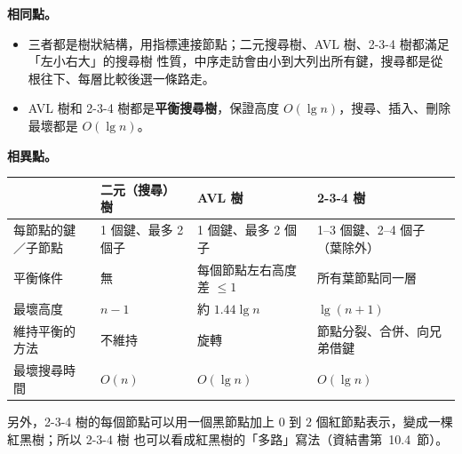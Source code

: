 \begin{pastsoln}
\textbf{相同點。}
\begin{itemize}[nosep]
\item 三者都是樹狀結構，用指標連接節點；二元搜尋樹、AVL 樹、2-3-4 樹都滿足「左小右大」的搜尋樹
性質，中序走訪會由小到大列出所有鍵，搜尋都是從根往下、每層比較後選一條路走。
\item AVL 樹和 2-3-4 樹都是\textbf{平衡搜尋樹}，保證高度 $O(\lg n)$，搜尋、插入、刪除最壞都是
$O(\lg n)$。
\end{itemize}

\textbf{相異點。}
\begin{center}
\small
\begin{tabular}{p{2.3cm}p{3.4cm}p{3.6cm}p{3.6cm}}
\toprule
 & 二元（搜尋）樹 & AVL 樹 & 2-3-4 樹 \\
\midrule
每節點的鍵／子節點 & 1 個鍵、最多 2 個子 & 1 個鍵、最多 2 個子 & 1--3 個鍵、2--4 個子（葉除外） \\
平衡條件 & 無 & 每個節點左右高度差 $\le 1$ & 所有葉節點同一層 \\
最壞高度 & $n - 1$ & 約 $1.44 \lg n$ & $\lg(n+1)$ \\
維持平衡的方法 & 不維持 & 旋轉 & 節點分裂、合併、向兄弟借鍵 \\
最壞搜尋時間 & $O(n)$ & $O(\lg n)$ & $O(\lg n)$ \\
\bottomrule
\end{tabular}
\end{center}
另外，2-3-4 樹的每個節點可以用一個黑節點加上 $0$ 到 $2$ 個紅節點表示，變成一棵紅黑樹；所以 2-3-4 樹
也可以看成紅黑樹的「多路」寫法（資結書第~10.4~節）。
\end{pastsoln}

